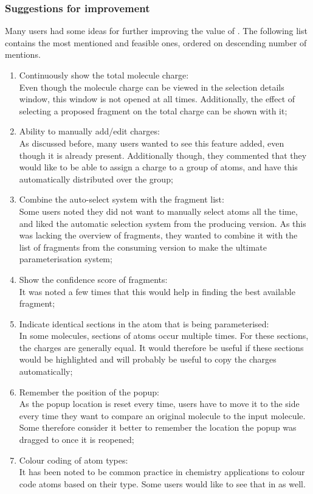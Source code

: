 \subsubsection{Suggestions for improvement}
Many users had some ideas for further improving the value of \oframp. The following list contains the most mentioned and feasible ones, ordered on descending number of mentions.
\begin{enumerate}
\item Continuously show the total molecule charge:\\
Even though the molecule charge can be viewed in the selection details window, this window is not opened at all times. Additionally, the effect of selecting a proposed fragment on the total charge can be shown with it;
\item Ability to manually add/edit charges:\\
As discussed before, many users wanted to see this feature added, even though it is already present. Additionally though, they commented that they would like to be able to assign a charge to a group of atoms, and have this automatically distributed over the group;
\item Combine the auto-select system with the fragment list:\\
Some users noted they did not want to manually select atoms all the time, and liked the automatic selection system from the producing version. As this was lacking the overview of fragments, they wanted to combine it with the list of fragments from the consuming version to make the ultimate parameterisation system;
\item Show the confidence score of fragments:\\
It was noted a few times that this would help in finding the best available fragment;
\item Indicate identical sections in the atom that is being parameterised:\\
In some molecules, sections of atoms occur multiple times. For these sections, the charges are generally equal. It would therefore be useful if these sections would be highlighted and will probably be useful to copy the charges automatically;
\item Remember the position of the popup:\\
As the popup location is reset every time, users have to move it to the side every time they want to compare an original molecule to the input molecule. Some therefore consider it better to remember the location the popup was dragged to once it is reopened;
\item Colour coding of atom types:\\
It has been noted to be common practice in chemistry applications to colour code atoms based on their type. Some users would like to see that in \oframp{} as well.
\end{enumerate}
